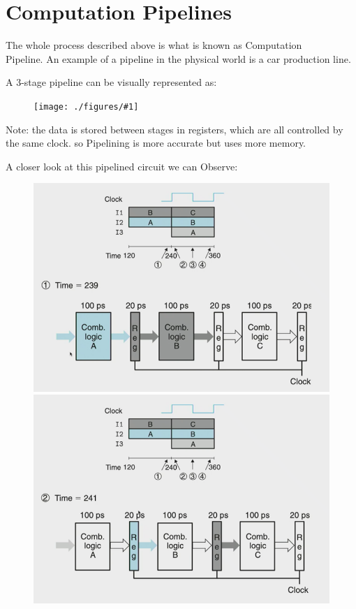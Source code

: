 \documentclass[12pt]{book}
\newcommand{\incimg}[2]{%
       \begin{figure}[h]
               \centering
               \texttt{[image: ./figures/\#1]}
       \end{figure}
}
\begin{document}
 \section*{Computation Pipelines}
 The whole process described above is what is known as Computation\\Pipeline. 
 An example of a pipeline in the physical world is a car production line.
 \pagebreak

 A 3-stage pipeline can be visually represented as:
 \incimg{3pipe}{0.5}

 Note: the data is stored between stages in registers, which are all controlled by the same clock. 
 so Pipelining is more accurate but uses more memory.

 A closer look at this pipelined circuit we can Observe:
 \begin{figure}[h]
         \centering
         \includegraphics[scale=0.5]{./figures/close1.png}
         \includegraphics[scale=0.5]{./figures/close2.png}
 \end{figure}
\end{document}
